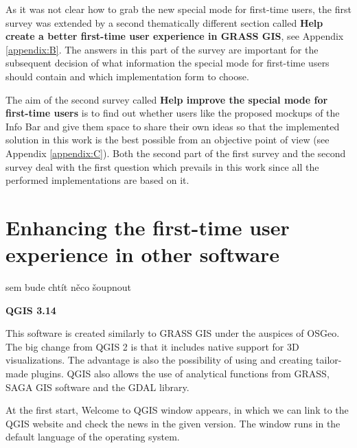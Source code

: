 \documentclass[a4paper,10pt,twoside]{article}
\begin{document}
As it was not clear how to grab the new special mode for first-time users, the first survey was extended by a second thematically different section called \textbf{Help create a better first-time user experience in GRASS GIS}, see Appendix \ref{appendix:B}. The answers in this part of the survey are important for the subsequent decision of what information the special mode for first-time users should contain and which implementation form to choose.

The aim of the second survey called \textbf{Help improve the special mode for first-time users} is to find out whether users like the proposed mockups of the Info Bar and give them space to share their own ideas so that the implemented solution in this work is the best possible from an objective point of view (see Appendix \ref{appendix:C}). Both the second part of the first survey and the second survey deal with the first question which prevails in this work since all the performed implementations are based on it. 

\newpage
\vspace*{-1cm}
\section{Enhancing the first-time user experience in other software}
\label{sec:usability_testing}

sem bude chtít něco šoupnout

\bigskip

\noindent \textbf {QGIS 3.14}

\noindent This software is created similarly to GRASS GIS under the auspices of OSGeo. The big change from QGIS 2 is that it includes native support for 3D visualizations. The advantage is also the possibility of using and creating tailor-made plugins. QGIS also allows the use of analytical functions from GRASS, SAGA GIS software and the GDAL library. 

At the first start, Welcome to QGIS window appears, in which we can link to the QGIS website and check the news in the given version. The window runs in the default language of the operating system.
\end{document}

